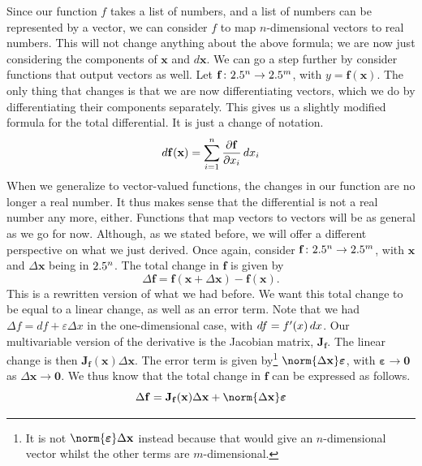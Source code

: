 \documentclass[a4paper,12pt]{article}
\begin{document}
Since our function $f$ takes a list of numbers, and a list of numbers can be represented by a vector, we can consider $f$ to map $n$-dimensional vectors to real numbers.
This will not change anything about the above formula; we are now just considering the components of $\mathbf{x}$ and $d\mathbf{x}$.
We can go a step further by consider functions that output vectors as well.
Let $\mathbf{f}\colon 2.5^n \to 2.5^m$, with $y = \mathbf{f}(\mathbf{x})$.
The only thing that changes is that we are now differentiating vectors, which we do by differentiating their components separately.
This gives us a slightly modified formula for the total differential.
It is just a change of notation.
\begin{equation*}
    d\mathbf{f}(\mathbf{x}) = \sum_{i=1}^{n} \frac{\partial\mathbf{f}}{\partial x_i} \mathop{}\!d x_i
\end{equation*}
When we generalize to vector-valued functions, the changes in our function are no longer a real number.
It thus makes sense that the differential is not a real number any more, either.
Functions that map vectors to vectors will be as general as we go for now.
Although, as we stated before, we will offer a different perspective on what we just derived.
Once again, consider $\mathbf{f}\colon 2.5^n \to 2.5^m$, with $\mathbf{x}$ and $\Delta\mathbf{x}$ being in $2.5^n$.
The total change in $\mathbf{f}$ is given by
\begin{equation*}
    \Delta \mathbf{f} = \mathbf{f}(\mathbf{x} + \Delta\mathbf{x}) - \mathbf{f}(\mathbf{x}).
\end{equation*}
This is a rewritten version of what we had before.
We want this total change to be equal to a linear change, as well as an error term.
Note that we had $\Delta f = df + \varepsilon\Delta x$ in the one-dimensional case, with $df = f'(x) \mathop{}\!d x$.
Our multivariable version of the derivative is the Jacobian matrix, $\mathbf{J_f}$.
The linear change is then $\mathbf{J_f}(\mathbf{x})\Delta\mathbf{x}$.
The error term is given by\footnote{It is not $\norm{\boldsymbol{\varepsilon}}\Delta\mathbf{x}$ instead because that would give an $n$-dimensional vector whilst the other terms are $m$-dimensional.} $\norm{\Delta\mathbf{x}}\boldsymbol{\varepsilon}$, with $\boldsymbol{\varepsilon} \to \mathbf{0}$ as $\Delta\mathbf{x} \to \mathbf{0}$.
We thus know that the total change in $\mathbf{f}$ can be expressed as follows.
\begin{equation*}
    \Delta\mathbf{f} = \mathbf{J_f}(\mathbf{x})\Delta\mathbf{x} + \norm{\Delta\mathbf{x}}\boldsymbol{\varepsilon}
\end{equation*}
\end{document}
